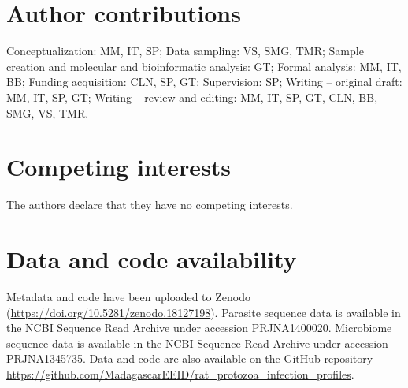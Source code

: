 \documentclass[oneside, a4paper, onecolumn, 11pt]{article}
\begin{document}
\section*{Author contributions}
Conceptualization: MM, IT, SP; Data sampling: VS, SMG, TMR; Sample creation and molecular and bioinformatic analysis: GT; Formal analysis: MM, IT, BB; Funding acquisition: CLN, SP, GT; Supervision: SP; Writing – original draft: MM, IT, SP, GT; Writing – review and editing: MM, IT, SP, GT, CLN, BB, SMG, VS, TMR.

\section*{Competing interests}
The authors declare that they have no competing interests.

\section*{Data and code availability}
Metadata and code have been uploaded to Zenodo (\url{https://doi.org/10.5281/zenodo.18127198}). Parasite sequence data is available in the NCBI Sequence Read Archive under accession PRJNA1400020. Microbiome sequence data is available in the NCBI Sequence Read Archive under accession PRJNA1345735. Data and code are also available on the GitHub repository \url{https://github.com/MadagascarEEID/rat_protozoa_infection_profiles}.


% 
\end{document}
